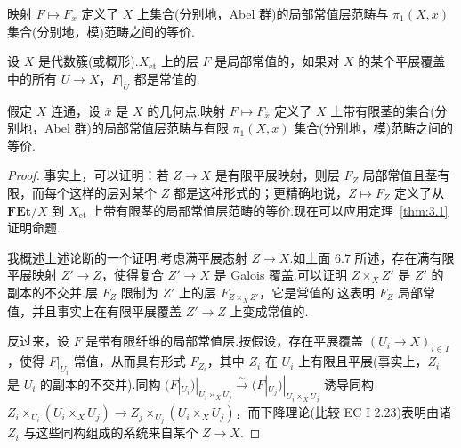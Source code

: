 \begin{proposition}\label{prop:6.15}
映射 $F \mapsto F_x$ 定义了 $X$ 上集合(分别地，Abel 群)的局部常值层范畴与 $\pi_1(X, x)$ 集合(分别地，模)范畴之间的等价.
\end{proposition}

设 $X$ 是代数簇(或概形).$X_{\mathrm{et}}$ 上的层 $F$ 是局部常值的，如果对 $X$ 的某个平展覆盖中的所有 $U \to X$，$F|_{U}$ 都是常值的.

\begin{proposition}\label{prop:6.16}
假定 $X$ 连通，设 $\bar{x}$ 是 $X$ 的几何点.映射 $F \mapsto F_{\bar{x}}$ 定义了 $X$ 上带有限茎的集合(分别地，Abel 群)的局部常值层范畴与有限 $\pi_1(X, \bar{x})$ 集合(分别地，模)范畴之间的等价.
\end{proposition}

\begin{proof}
事实上，可以证明：若 $Z \to X$ 是有限平展映射，则层 $F_Z$ 局部常值且茎有限，而每个这样的层对某个 $Z$ 都是这种形式的；更精确地说，$Z \mapsto F_Z$ 定义了从 $\mathbf{FEt}/X$ 到 $X_{\mathrm{et}}$ 上带有限茎的局部常值层范畴的等价.现在可以应用定理~\ref{thm:3.1} 证明命题.

我概述上述论断的一个证明.考虑满平展态射 $Z \to X$.如上面 6.7 所述，存在满有限平展映射 $Z' \to Z$，使得复合 $Z' \to X$ 是 Galois 覆盖.可以证明 $Z \times_{X} Z'$ 是 $Z'$ 的副本的不交并.层 $F_Z$ 限制为 $Z'$ 上的层 $F_{Z \times_{X} Z'}$，它是常值的.这表明 $F_Z$ 局部常值，并且事实上在有限平展覆盖 $Z' \to Z$ 上变成常值的.

反过来，设 $F$ 是带有限纤维的局部常值层.按假设，存在平展覆盖 $(U_i \to X)_{i \in I}$，使得 $F|_{U_i}$ 常值，从而具有形式 $F_{Z_i}$，其中 $Z_i$ 在 $U_i$ 上有限且平展(事实上，$Z_i$ 是 $U_i$ 的副本的不交并).同构 $(F|_{U_i})|_{U_i \times_{X} U_j} \xrightarrow{\sim} (F|_{U_j})|_{U_i \times_{X} U_j}$ 诱导同构 $Z_i \times_{U_i} (U_i \times_{X} U_j) \to Z_j \times_{U_j} (U_i \times_{X} U_j)$，而下降理论(比较 EC I 2.23)表明由诸 $Z_i$ 与这些同构组成的系统来自某个 $Z \to X$.
\end{proof}
